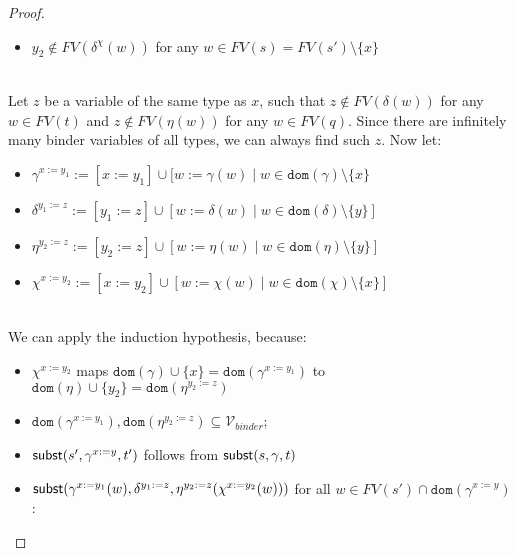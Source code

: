\documentclass{lmcs}
\theoremstyle{theorem}\newtheorem{theorem}{Theorem}
\theoremstyle{theorem}\newtheorem{lemma}[theorem]{Lemma}
\theoremstyle{theorem}\newtheorem{corollary}[theorem]{Corollary}
\theoremstyle{definition}\newtheorem{definition}[theorem]{Definition}
\theoremstyle{definition}\newtheorem{example}[theorem]{Example}
\newcommand{\Vbound}{\mathcal{V}_{\mathit{binder}}}
\newcommand{\FV}{\mathit{FV}}
\newcommand{\domain}{\mathtt{dom}}
\newcommand{\avar}{x}
\newcommand{\bvar}{y}
\newcommand{\cvar}{z}
\begin{document}
\begin{proof}
{\begin{itemize}
\begin{itemize}
      \item $\bvar_2 \notin \FV(\delta^\chi(w))$ for any $w \in \FV(s) = \FV(s') \setminus \{\avar\}$
      \end{itemize}
      \ \\
      Let $\cvar$ be a variable of the same type as $\avar$, such that $\cvar \notin \FV(\delta(w))$
      for any $w \in \FV(t)$ and $\cvar \notin \FV(\eta(w))$ for any $w \in \FV(q)$.
      Since there are infinitely many binder variables of all types, we can always find such $\cvar$.
      Now let:
      \begin{itemize}
      \item $\gamma^{\avar:=\bvar_1} := [\avar:=\bvar_1] \cup [w:=\gamma(w) \mid w \in \domain(\gamma)
        \setminus \{\avar\}$
      \item $\delta^{\bvar_1:=\cvar} := [\bvar_1:=\cvar] \cup [w:=\delta(w) \mid w \in \domain(\delta)
        \setminus \{\bvar\}]$
      \item $\eta^{\bvar_2:=\cvar} := [\bvar_2:=\cvar] \cup [w:=\eta(w) \mid w \in \domain(\eta)
        \setminus \{\bvar\}]$
      \item $\chi^{\avar:=\bvar_2} := [\avar:=\bvar_2] \cup [w := \chi(w) \mid w \in \domain(\chi)
        \setminus \{\avar\}]$
      \end{itemize}
      \ \\
      We can apply the induction hypothesis, because:
      \begin{itemize}
      \item $\chi^{\avar:=\bvar_2}$ maps $\domain(\gamma) \cup \{\avar\} =
        \domain(\gamma^{\avar:=\bvar_1})$ to $\domain(\eta) \cup \{\bvar_2\} = \domain(\eta^{\bvar_2:=
        \cvar})$
      \item $\domain(\gamma^{\avar:=\bvar_1}),\domain(\eta^{\bvar_2:=\cvar}) \subseteq \Vbound$;
      \item $\subrel{s',\gamma^{\avar:=\bvar},t'}$ follows from $\mathsf{subst}(s,\gamma,t)$
      \item $\subrel{\gamma^{\avar:=\bvar_1}(w),\delta^{\bvar_1:=\cvar},\eta^{\bvar_2:=\cvar}(\chi^{
        \avar:=\bvar_2}(w))}$ for all $w \in \FV(s') \cap \domain(\gamma^{\avar:=\bvar})$:
\end{itemize}
\end{itemize}}
\end{proof}
\end{document}
